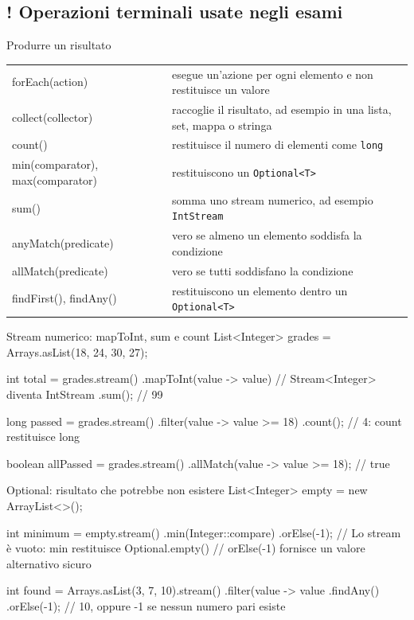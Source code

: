 ﻿\documentclass[10pt,a4paper]{article}
\newcommand{\cmd}[1]{\texttt{#1}}
\DeclareRobustCommand{\exammark}{%
  \texorpdfstring{\textcolor{examred}{\bfseries\Large !}\hspace{.18em}}{! }%
}
\newcommand{\topicsubsection}[1]{\Needspace{10\baselineskip}\subsection{#1}}
\newenvironment{topicblock}{%
  \par\medskip\noindent\begin{minipage}{\textwidth}%
}{%
  \end{minipage}\par\medskip%
}
\begin{document}
\begin{topicblock}
\topicsubsection{\exammark Operazioni terminali usate negli esami}

\begin{concept}{Produrre un risultato}
\begin{tabularx}{\textwidth}{>{\ttfamily\small}p{4.2cm} X}
forEach(action) & esegue un'azione per ogni elemento e non restituisce un valore \\
collect(collector) & raccoglie il risultato, ad esempio in una lista, set, mappa o stringa \\
count() & restituisce il numero di elementi come \cmd{long} \\
min(comparator), max(comparator) & restituiscono un \cmd{Optional<T>} \\
sum() & somma uno stream numerico, ad esempio \cmd{IntStream} \\
anyMatch(predicate) & vero se almeno un elemento soddisfa la condizione \\
allMatch(predicate) & vero se tutti soddisfano la condizione \\
findFirst(), findAny() & restituiscono un elemento dentro un \cmd{Optional<T>} \\
\end{tabularx}
\end{concept}

\begin{codebox}{Stream numerico: mapToInt, sum e count}
List<Integer> grades = Arrays.asList(18, 24, 30, 27);

int total = grades.stream()
    .mapToInt(value -> value) // Stream<Integer> diventa IntStream
    .sum();                   // 99

long passed = grades.stream()
    .filter(value -> value >= 18)
    .count();                 // 4: count restituisce long

boolean allPassed = grades.stream()
    .allMatch(value -> value >= 18); // true
\end{codebox}

\begin{codebox}{Optional: risultato che potrebbe non esistere}
List<Integer> empty = new ArrayList<>();

int minimum = empty.stream()
    .min(Integer::compare)
    .orElse(-1);
// Lo stream è vuoto: min restituisce Optional.empty()
// orElse(-1) fornisce un valore alternativo sicuro

int found = Arrays.asList(3, 7, 10).stream()
    .filter(value -> value %
    .findAny()
    .orElse(-1); // 10, oppure -1 se nessun numero pari esiste
\end{codebox}

\end{topicblock}
\end{document}
